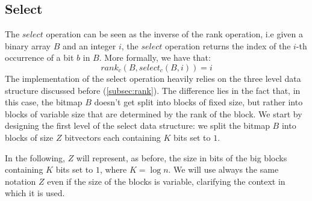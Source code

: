 


\subsection{Select}
The $select$ operation can be seen as the inverse of the rank operation, i.e given a binary array $B$ and an integer $i$, the $select$ operation returns the index of the $i$-th occurrence of a bit $b$ in $B$. More formally, we have that:
\[
    rank_c(B, select_c(B, i)) = i
\]
The implementation of the select operation heavily relies on the three level data structure discussed before (\ref{subsec:rank}). The difference lies in the fact that, in this case, the bitmap $B$ doesn't get split into blocks of fixed size, but rather into blocks of variable size that are determined by the rank of the block. We start by designing the first level of the select data structure: we split the bitmap $B$ into blocks of size $Z$ bitvectors each containing $K$ bits set to $1$.

\begin{remark}
    In the following, $Z$ will represent, as before, the size in bits of the big blocks containing $K$ bits set to $1$, where $K = \log n$. We will use always the same notation $Z$ even if the size of the blocks is variable, clarifying the context in which it is used.
\end{remark}

